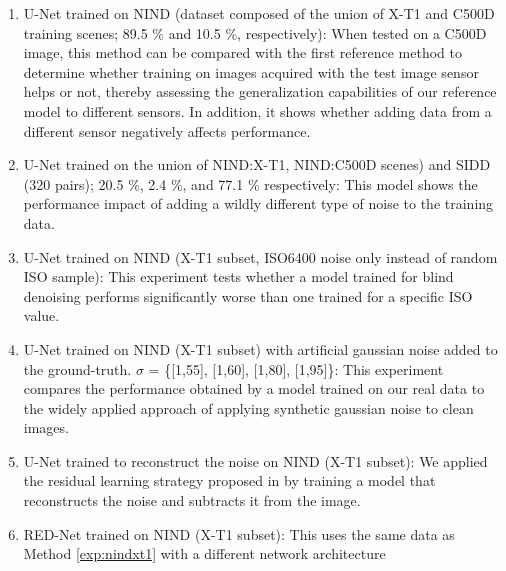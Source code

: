 \begin{enumerate}
\itemsep0em 
\setcounter{enumi}{3}
  \item\label{exp:nindall}   U-Net trained on \ac{NIND} (dataset composed of the union of \ac{X-T1} and \ac{C500D} training scenes; 89.5 \% and 10.5 \%, respectively):\newline
  When tested on a \ac{C500D} image, this method can be compared with the first reference method to determine whether training on images acquired with the test image sensor helps or not, thereby assessing the generalization capabilities of our reference model to different sensors.  In addition, it shows whether adding data from a different sensor negatively affects performance.
  \item\label{exp:nindsidd} U-Net trained on the union of \ac{NIND}:\ac{X-T1}, \ac{NIND}:\ac{C500D} scenes) and \ac{SIDD} (320 pairs); 20.5 \%, 2.4 \%, and 77.1 \% respectively:\newline
  This model shows the performance impact of adding a wildly different type of noise to the training data.
  \item\label{exp:nind6400} U-Net trained on \ac{NIND} (\ac{X-T1} subset, ISO6400 noise only instead of random ISO sample):\newline
  This experiment tests whether a model trained for blind denoising performs significantly worse than one trained for a specific ISO value.
  \item\label{exp:nindart} U-Net trained on \ac{NIND} (\ac{X-T1} subset) with artificial gaussian noise added to the ground-truth. $\sigma$ = \{[1,55], [1,60], [1,80], [1,95]\}:\newline
  This experiment compares the performance obtained by a model trained on our real data to the widely applied approach of applying synthetic gaussian noise to clean images.
  \item\label{exp:nindmakenoise} U-Net trained to reconstruct the noise on \ac{NIND} (\ac{X-T1} subset):\newline
  We applied the residual learning strategy proposed in \cite{dncnn} by training a model that reconstructs the noise and subtracts it from the image.
  \item\label{exp:nindred} \ac{RED-Net} \cite{rednet} trained on \ac{NIND} (\ac{X-T1} subset):\newline
  This uses the same data as Method \ref{exp:nindxt1} with a different network architecture

\end{enumerate}

